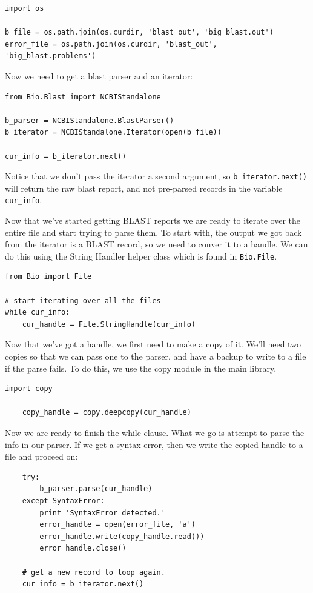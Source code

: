 \documentclass{article}
\begin{document}
\begin{verbatim}
import os
 
b_file = os.path.join(os.curdir, 'blast_out', 'big_blast.out')
error_file = os.path.join(os.curdir, 'blast_out', 'big_blast.problems')
\end{verbatim}

Now we need to get a blast parser and an iterator:

\begin{verbatim}
from Bio.Blast import NCBIStandalone

b_parser = NCBIStandalone.BlastParser()
b_iterator = NCBIStandalone.Iterator(open(b_file))

cur_info = b_iterator.next()
\end{verbatim}

Notice that we don't pass the iterator a second argument, so \verb|b_iterator.next()| will return the raw blast report, and not pre-parsed records in the variable \verb|cur_info|.


Now that we've started getting BLAST reports we are ready to iterate over the entire file and start trying to parse them. To start with, the output we got back from the iterator is a BLAST record, so we need to conver it to a handle. We can do this using the String Handler helper class which is found in \verb|Bio.File|.

\begin{verbatim}
from Bio import File

# start iterating over all the files
while cur_info:
    cur_handle = File.StringHandle(cur_info)
\end{verbatim}

Now that we've got a handle, we first need to make a copy of it. We'll need two copies so that we can pass one to the parser, and have a backup to write to a file if the parse fails. To do this, we use the copy module in the main library.

\begin{verbatim}
import copy

    copy_handle = copy.deepcopy(cur_handle)
\end{verbatim}

Now we are ready to finish the while clause. What we go is attempt to parse the info in our parser. If we get a syntax error, then we write the copied handle to a file and proceed on:

\begin{verbatim}
    try:
        b_parser.parse(cur_handle)
    except SyntaxError:
        print 'SyntaxError detected.'
        error_handle = open(error_file, 'a')
        error_handle.write(copy_handle.read())
        error_handle.close()
            
    # get a new record to loop again.
    cur_info = b_iterator.next()
\end{verbatim}
\end{document}
